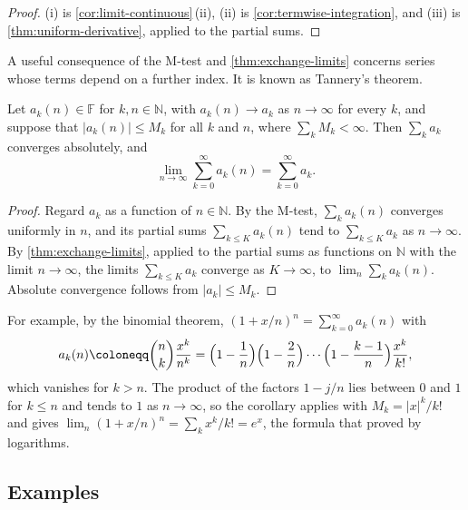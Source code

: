 \begin{proof}
(i) is \cref{cor:limit-continuous}\,(ii), (ii) is \cref{cor:termwise-integration}, and (iii) is \cref{thm:uniform-derivative}, applied to the partial sums.
\end{proof}

A useful consequence of the M-test and \cref{thm:exchange-limits} concerns series whose terms depend on a further index. It is known as Tannery's theorem.

\begin{corollary}
\label{cor:tannery}
Let $a_k(n)\in\mathbb F$ for $k,n\in\mathbb N$, with $a_k(n)\to a_k$ as $n\to\infty$ for every $k$, and suppose that $|a_k(n)|\le M_k$ for all $k$ and $n$, where $\sum_kM_k<\infty$. Then $\sum_ka_k$ converges absolutely, and
\[
\lim_{n\to\infty}\sum_{k=0}^\infty a_k(n)=\sum_{k=0}^\infty a_k .
\]
\end{corollary}

\begin{proof}
Regard $a_k$ as a function of $n\in\mathbb N$. By the M-test, $\sum_ka_k(n)$ converges uniformly in $n$, and its partial sums $\sum_{k\le K}a_k(n)$ tend to $\sum_{k\le K}a_k$ as $n\to\infty$. By \cref{thm:exchange-limits}, applied to the partial sums as functions on $\mathbb N$ with the limit $n\to\infty$, the limits $\sum_{k\le K}a_k$ converge as $K\to\infty$, to $\lim_n\sum_ka_k(n)$. Absolute convergence follows from $|a_k|\le M_k$.
\end{proof}

For example, by the binomial theorem, $(1+x/n)^n=\sum_{k=0}^\infty a_k(n)$ with
\[
a_k(n)\coloneqq\binom nk\frac{x^k}{n^k}=\Bigl(1-\frac1n\Bigr)\Bigl(1-\frac2n\Bigr)\cdots\Bigl(1-\frac{k-1}n\Bigr)\frac{x^k}{k!} ,
\]
which vanishes for $k>n$. The product of the factors $1-j/n$ lies between $0$ and $1$ for $k\le n$ and tends to $1$ as $n\to\infty$, so the corollary applies with $M_k=|x|^k/k!$ and gives $\lim_n(1+x/n)^n=\sum_kx^k/k!=e^x$, the formula that  proved by logarithms.

\subsection{Examples}

